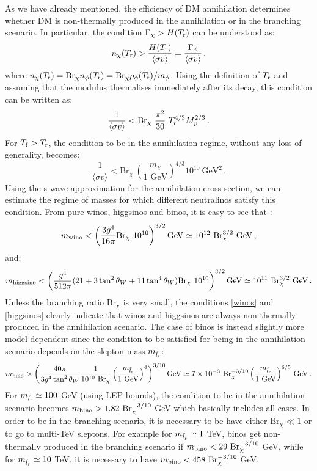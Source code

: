 \documentclass[11pt,a4paper]{article}
\newcommand{\be}{\begin{equation}}
\newcommand{\ee}{\end{equation}}
\begin{document}
As we have already mentioned, the efficiency of DM annihilation determines whether DM is non-thermally produced in the annihilation or in the branching scenario. In particular, the condition $\Gamma_\chi > H(T_{\rm r})$ can be understood as:
\be
n_\chi (T_{\rm r}) > \frac{H(T_{\rm r})}{\langle \sigma v \rangle}=\frac{\Gamma_\phi}{\langle \sigma v \rangle}\,,
\ee
where $n_\chi (T_{\rm r}) = \text{Br}_{\chi} n_\phi(T_{\rm r}) =  \text{Br}_{\chi} \rho_\phi(T_{\rm r})/m_\phi $. Using the definition of $T_{\rm r}$ and assuming that the modulus thermalises immediately after its decay, this condition can be written as:
\be
\frac{1}{\langle \sigma v \rangle} < \text{Br}_\chi\ \frac{\pi^2}{30}\ T_{\rm r}^{4/3} M_p^{2/3}\,.
\label{cond1}
\ee
For $T_{\rm f}>T_{\rm r}$, the condition to be in the annihilation regime, without any loss of generality, becomes: 
\be
\frac{1}{\langle \sigma v \rangle} < \text{Br}_\chi\ \left(\frac{m_\chi}{ \text{1 GeV}}\right)^{4/3} 10^{10}\ \text{GeV}^2\,.
\label{Eqcond}
\ee
Using the s-wave approximation for the annihilation cross section, we can estimate the regime of masses for which different neutralinos satisfy this condition. From pure winos, higgsinos and binos, it is easy to see that \cite{ArkaniHamed:2006mb}:
\be
m_{\rm wino} < \left( \frac{3 g^4}{16 \pi} \text{Br}_\chi\ 10^{10} \right)^{3/2} \text{GeV} \simeq 10^{12}\ \text{Br}_{\chi}^{3/2}\ \text{GeV}\,,
\label{winos}
\ee
and:
\be 
m_{\rm higgsino} < \left( \frac{g^4}{512 \pi} (21+3\tan^2\theta_W +11\tan^4\theta_W) \text{Br}_{\chi}\ 10^{10} \right)^{3/2} \text{GeV} \simeq 10^{11}\ \text{Br}_\chi^{3/2}\ \text{GeV}\,.
\label{higgsinos}
\ee
Unless the branching ratio $\text{Br}_\chi$ is very small, the conditions \eqref{winos} and \eqref{higgsinos} clearly indicate that winos and higgsinos are always non-thermally produced in the annihilation scenario. The case of binos is instead slightly more model dependent since the condition to be satisfied for being in the annihilation scenario depends on the slepton mass $m_{\tilde{l}_{\rm r}}$: 
\be
m_{\rm bino}>\left(\frac{40\pi}{3g^4 \tan^2\theta_W} \frac{1}{10^{10}\ \text{Br}_\chi} \left(\frac{m_{\tilde{l}_{\rm r}}}{\text{1 GeV}}\right)^4 \right)^{3/10} \text{GeV} \simeq 7\times 10^{-3}\ \text{Br}_\chi^{-3/10} \left(\frac{m_{\tilde{l}_{\rm r}}}{\text{1 GeV}}\right)^{6/5} \, \text{GeV}\,.
\label{binos}
\ee
For $m_{\tilde{l}_{\rm r}}\simeq 100$ GeV (using LEP bounds), the condition to be in the annihilation scenario becomes $m_{\rm bino} > 1.82\ \text{Br}_\chi^{-3/10}$ GeV which basically includes all cases. In order to be in the branching scenario, it is necessary to be have either $\text{Br}_\chi\ll1$ or to go to multi-TeV sleptons. For example for $m_{\tilde{l}_{\rm r}}\simeq 1$ TeV, binos get non-thermally produced in the branching scenario if $m_{\rm bino} < 29\ \text{Br}_\chi^{-3/10}$ GeV, while for $m_{\tilde{l}_{\rm r}}\simeq 10$ TeV, it is necessary to have $m_{\rm bino} < 458\ \text{Br}_\chi^{-3/10}$ GeV.
\end{document}
